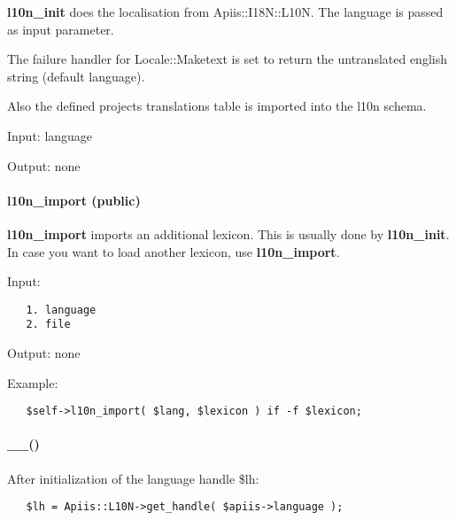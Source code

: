 \textbf{l10n\_init} does the localisation from Apiis::I18N::L10N. The language is
passed as input parameter.



The failure handler for Locale::Maketext is set to return the untranslated
english string (default language).



Also the defined projects translations table is imported into the l10n
schema.



Input: language



Output: none

\paragraph*{l10n\_import (public)\label{Apiis::Init_--_Basic_initialisation_object_for_the_complete_APIIS_structure_l10n_import_public_}}


\textbf{l10n\_import} imports an additional lexicon. This is usually done by
\textbf{l10n\_init}. In case you want to load another lexicon, use \textbf{l10n\_import}.



Input:

\begin{verbatim}
   1. language
   2. file
\end{verbatim}


Output: none



Example:

\begin{verbatim}
   $self->l10n_import( $lang, $lexicon ) if -f $lexicon;
\end{verbatim}
\paragraph*{\_\_()\label{Apiis::Init_--_Basic_initialisation_object_for_the_complete_APIIS_structure__}}


After initialization of the language handle \$lh:

\begin{verbatim}
   $lh = Apiis::L10N->get_handle( $apiis->language );
\end{verbatim}


